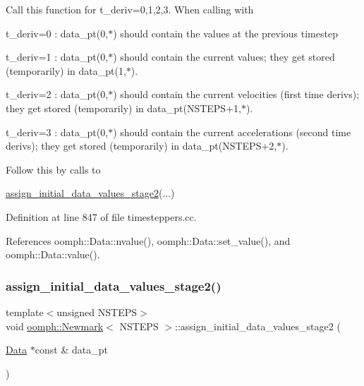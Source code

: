 Call this function for t\+\_\+deriv=0,1,2,3. When calling with
\begin{DoxyItemize}
\item t\+\_\+deriv=0 \+: data\+\_\+pt(0,$\ast$) should contain the values at the previous timestep
\item t\+\_\+deriv=1 \+: data\+\_\+pt(0,$\ast$) should contain the current values; they get stored (temporarily) in data\+\_\+pt(1,$\ast$).
\item t\+\_\+deriv=2 \+: data\+\_\+pt(0,$\ast$) should contain the current velocities (first time derivs); they get stored (temporarily) in data\+\_\+pt(N\+S\+T\+E\+P\+S+1,$\ast$).
\item t\+\_\+deriv=3 \+: data\+\_\+pt(0,$\ast$) should contain the current accelerations (second time derivs); they get stored (temporarily) in data\+\_\+pt(N\+S\+T\+E\+P\+S+2,$\ast$).
\end{DoxyItemize}Follow this by calls to 
\begin{DoxyCode}
\hyperlink{classoomph_1_1Newmark_a7bc09dd3b0ede9ebbb6b0b1488751301}{assign\_initial\_data\_values\_stage2}(...)
\end{DoxyCode}
 

Definition at line 847 of file timesteppers.\+cc.



References oomph\+::\+Data\+::nvalue(), oomph\+::\+Data\+::set\+\_\+value(), and oomph\+::\+Data\+::value().

\mbox{\label{classoomph_1_1Newmark_a7bc09dd3b0ede9ebbb6b0b1488751301}} 
\subsubsection{\texorpdfstring{assign\+\_\+initial\+\_\+data\+\_\+values\+\_\+stage2()}{assign\_initial\_data\_values\_stage2()}}
{\footnotesize\ttfamily template$<$unsigned N\+S\+T\+E\+PS$>$ \\
void \hyperlink{classoomph_1_1Newmark}{oomph\+::\+Newmark}$<$ N\+S\+T\+E\+PS $>$\+::assign\+\_\+initial\+\_\+data\+\_\+values\+\_\+stage2 (\begin{DoxyParamCaption}\item[{\hyperlink{classoomph_1_1Data}{Data} $\ast$const \&}]{data\+\_\+pt }\end{DoxyParamCaption})}



